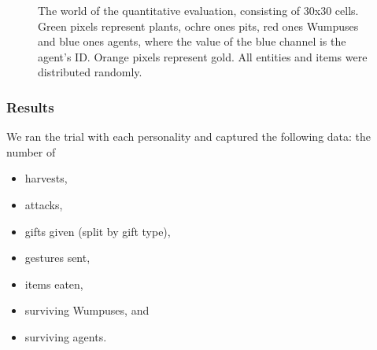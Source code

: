 \begin{figure}
	\centering
	\caption{The world of the quantitative evaluation, consisting of 30x30 cells. Green pixels represent plants, ochre ones pits, red ones Wumpuses and blue ones agents, where the value of the blue channel is the agent's ID. Orange pixels represent gold. All entities and items were distributed randomly.}
	\label{fig:evalWorldQuant}
\end{figure}

\subsubsection{Results}

We ran the trial with each personality and captured the following data: the number of

\begin{itemize}
	\item harvests,
	\item attacks,
	\item gifts given (split by gift type),
	\item gestures sent,
	\item items eaten,
	\item surviving Wumpuses, and
	\item surviving agents.
\end{itemize}


